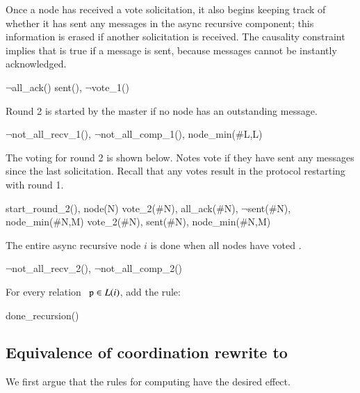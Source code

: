Once a node has received a  vote solicitation, it also begins keeping track of whether it has sent any messages in the async recursive component; this information is erased if another  solicitation is received.  The causality constraint implies that  is true if a message is sent, because messages cannot be instantly acknowledged.

\begin{Drules}
      {$\lnot$all_ack()}
      {sent(), $\lnot$vote_1()}
\end{Drules}

Round 2 is started by the master if no node has an outstanding message.

\begin{Drules}
      {$\lnot$not_all_recv_1(), $\lnot$not_all_comp_1(), node_min(#L,L)}
\end{Drules}

The voting for round 2 is shown below.  Notes vote  if they have sent any messages since the last  solicitation.  Recall that any  votes result in the protocol restarting with round 1.

\begin{Drules}
      {start_round_2(), node(N)}
      {vote_2(#N), all_ack(#N), $\lnot$sent(#N), node_min(#N,M)}
      {vote_2(#N), sent(#N), node_min(#N,M)}
\end{Drules}

The entire async recursive node $i$ is done when all nodes have voted .

\begin{Drules}
      {$\lnot$not_all_recv_2(), $\lnot$not_all_comp_2()}
\end{Drules}

For every relation $\dedalus{p} \in L(i)$, add the rule:

\begin{Drules}
      {done_recursion()}
\end{Drules}

\subsection{Equivalence of coordination rewrite to \\ {\large \bf \plang}}
\label{sec:equiv-p}
We first argue that the rules for computing  have the desired effect.

